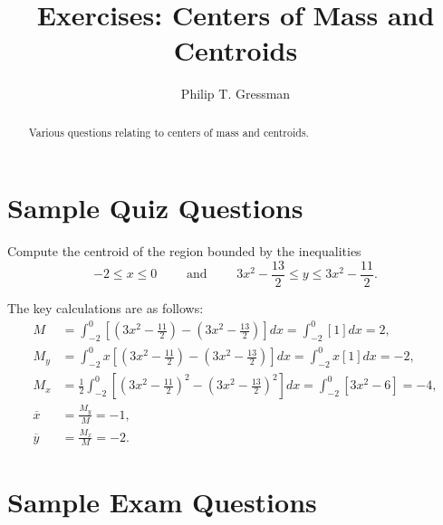 \documentclass{ximera}
\title{Exercises: Centers of Mass and Centroids}
\author{Philip T. Gressman}
\begin{document}
\begin{abstract}
Various questions relating to centers of mass and centroids.
\end{abstract}
\maketitle


\section*{Sample Quiz Questions}
\begin{question}%

Compute the centroid of the region bounded by the inequalities \[-2 \leq x \leq 0 \qquad \text{ and } \qquad {3x^2-\frac{13}{2}} \leq y \leq {3x^2-\frac{11}{2}}.\]
\begin{multiplechoice}
\end{multiplechoice}
\begin{feedback}
The key calculations are as follows: 
\[ \begin{aligned}
M & = \int_{-2}^{0} \left[ \left({3x^2-\frac{11}{2}}\right) - \left({3x^2-\frac{13}{2}}\right) \right] dx = \int_{-2}^{0} \left[{1}\right] dx = 2, \\
M_y & = \int_{-2}^{0} x \left[ \left({3x^2-\frac{11}{2}}\right) - \left({3x^2-\frac{13}{2}}\right) \right] dx = \int_{-2}^{0} x \left[{1}\right] dx = -2, \\
M_x & = \frac{1}{2} \int_{-2}^{0} \left[ \left({3x^2-\frac{11}{2}}\right)^2 - \left({3x^2-\frac{13}{2}}\right)^2 \right] dx = \int_{-2}^{0} \left[{3x^2-6}\right] = -4, \\
 \overline{x} &  = \frac{M_y}{M} = -1, \\
 \overline{y} &  = \frac{M_x}{M} = -2.\end{aligned}\]
\end{feedback}

\end{question}

\section*{Sample Exam Questions}
\end{document}
